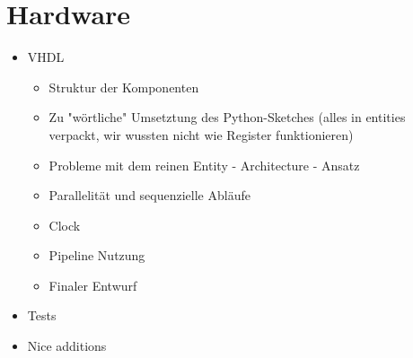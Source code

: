 \documentclass[paper=a4,fontsize=12pt,twocolumn]{scrreprt}
\begin{document}





\chapter{Hardware}


\begin{itemize}
    \item VHDL
    \begin{itemize}
        \item Struktur der Komponenten
        \item Zu "wörtliche" Umsetztung des Python-Sketches (alles in entities verpackt, wir wussten nicht wie Register funktionieren)
        \item Probleme mit dem reinen Entity - Architecture - Ansatz
        \item Parallelität und sequenzielle Abläufe
        \item Clock
        \item Pipeline Nutzung
        \item Finaler Entwurf
    \end{itemize}
    \item Tests
    \item Nice additions
\end{itemize}
\end{document}
